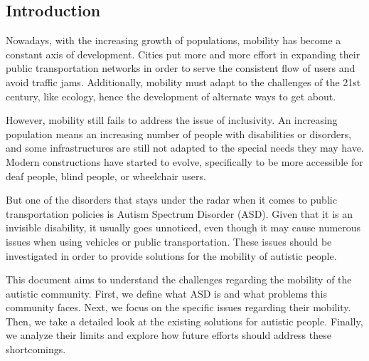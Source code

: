 \subsection{Introduction}

Nowadays, with the increasing growth of populations, mobility has become a constant axis of development. Cities put more and more effort in expanding their public transportation networks in order to serve the consistent flow of users and avoid traffic jams. Additionally, mobility must adapt to the challenges of the 21st century, like ecology, hence the development of alternate ways to get about.

However, mobility still fails to address the issue of inclusivity. An increasing population means an increasing number of people with disabilities or disorders, and some infrastructures are still not adapted to the special needs they may have. Modern constructions have started to evolve, specifically to be more accessible for deaf people, blind people, or wheelchair users.

But one of the disorders that stays under the radar when it comes to public transportation policies is Autism Spectrum Disorder (ASD). Given that it is an invisible disability, it usually goes unnoticed, even though it may cause numerous issues when using vehicles or public transportation. These issues should be investigated in order to provide solutions for the mobility of autistic people.

This document aims to understand the challenges regarding the mobility of the autistic community. First, we define what ASD is and what problems this community faces. Next, we focus on the specific issues regarding their mobility. Then, we take a detailed look at the existing solutions for autistic people. Finally, we analyze their limits and explore how future efforts should address these shortcomings.
